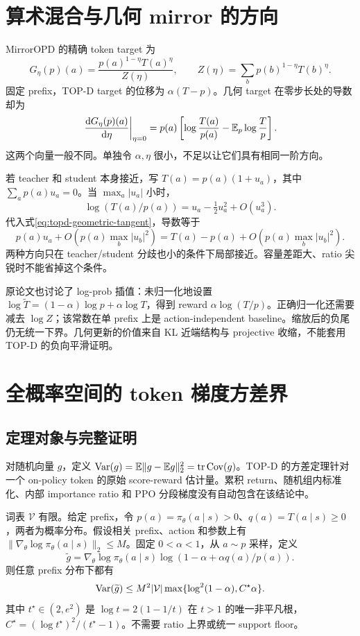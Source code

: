 \section{算术混合与几何 mirror 的方向}

MirrorOPD 的精确 token target 为
\begin{equation}
 G_\eta(p)(a)=\frac{p(a)^{1-\eta}T(a)^\eta}{Z(\eta)},\qquad
 Z(\eta)=\sum_bp(b)^{1-\eta}T(b)^\eta.
 \label{eq:topd-geometric-comparison}
\end{equation}
固定 prefix，TOP-D target 的位移为 $\alpha(T-p)$。几何 target 在零步长处的导数却为
\begin{equation}
 \left.\frac{\mathrm{d} G_\eta(p)(a)}{\mathrm{d}\eta}\right|_{\eta=0}
 =p(a)\left[\log\frac{T(a)}{p(a)}-\mathbb{E}_p\log\frac Tp\right].
 \label{eq:topd-geometric-tangent}
\end{equation}
这两个向量一般不同。单独令 $\alpha,\eta$ 很小，不足以让它们具有相同一阶方向。

若 teacher 和 student 本身接近，写 $T(a)=p(a)(1+u_a)$，其中 $\sum_ap(a)u_a=0$。当 $\max_a|u_a|$ 小时，
\[
 \log(T(a)/p(a))=u_a-\tfrac12u_a^2+O(u_a^3).
\]
代入式\eqref{eq:topd-geometric-tangent}，导数等于
\[
 p(a)u_a+O(p(a)\max_b|u_b|^2)=T(a)-p(a)+O(p(a)\max_b|u_b|^2).
\]
两种方向只在 teacher/student 分歧也小的条件下局部接近。容量差距大、ratio 尖锐时不能省掉这个条件。

原论文也讨论了 log-prob 插值：未归一化地设置 $\log\widetilde T=(1-\alpha)\log p+\alpha\log T$，得到 reward $\alpha\log(T/p)$。正确归一化还需要减去 $\log Z$；该常数在单 prefix 上是 action-independent baseline。缩放后的负尾仍无统一下界。几何更新的价值来自 KL 近端结构与 projective 收缩，不能套用 TOP-D 的负向平滑证明。

\section{全概率空间的 token 梯度方差界}
\subsection{定理对象与完整证明}

对随机向量 $g$，定义 $\operatorname{Var}(g)=\mathbb{E}\|g-\mathbb{E} g\|_2^2=\operatorname{tr}\operatorname{Cov}(g)$。TOP-D 的方差定理针对一个 on-policy token 的原始 score-reward 估计量。累积 return、随机组内标准化、内部 importance ratio 和 PPO 分段梯度没有自动包含在该结论中。

\begin{theorem}
\label{thm:topd-variance}
词表 $\mathcal V$ 有限。给定 prefix，令 $p(a)=\pi_\theta(a\mid s)>0$、$q(a)=T(a\mid s)\geq0$，两者为概率分布。假设相关 prefix、action 和参数上有 $\|\nabla_\theta\log\pi_\theta(a\mid s)\|_2\leq M$。固定 $0<\alpha<1$，从 $a\sim p$ 采样，定义
\[
 \widetilde g=\nabla_\theta\log\pi_\theta(a\mid s)
 \log(1-\alpha+\alpha q(a)/p(a)).
\]
则任意 prefix 分布下都有
\begin{equation}
 \operatorname{Var}(\widetilde g)\leq M^2|\mathcal V|
 \max\{\log^2(1-\alpha),C^\star\alpha\}.
 \label{eq:topd-original-variance}
\end{equation}
其中 $t^\star\in(2,e^2)$ 是 $\log t=2(1-1/t)$ 在 $t>1$ 的唯一非平凡根，$C^\star=(\log t^\star)^2/(t^\star-1)$。不需要 ratio 上界或统一 support floor。
\end{theorem}

